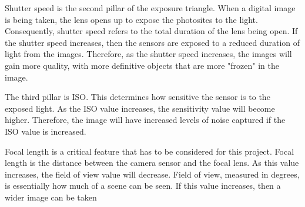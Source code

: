 Shutter speed is the second pillar of the exposure triangle. When a digital image is being taken, the lens opens up to expose the photosites to the light. Consequently, shutter speed refers to the total duration of the lens being open. If the shutter speed increases, then the sensors are exposed to a reduced duration of light from the images. Therefore, as the shutter speed increases, the images will gain more quality, with more definitive objects that are more "frozen" in the image. \citep{CC-CE}

The third pillar is ISO. This determines how sensitive the sensor is to the exposed light. As the ISO value increases, the sensitivity value will become higher. Therefore, the image will have increased levels of noise captured if the ISO value is increased.  \citep{CC-CE}

Focal length is a critical feature that has to be considered for this project. Focal length is the distance between the camera sensor and the focal lens. As this value increases, the field of view value will decrease. Field of view, measured in degrees, is essentially how much of a scene can be seen. If this value increases, then a wider image can be taken \citep{DM-FOW}






